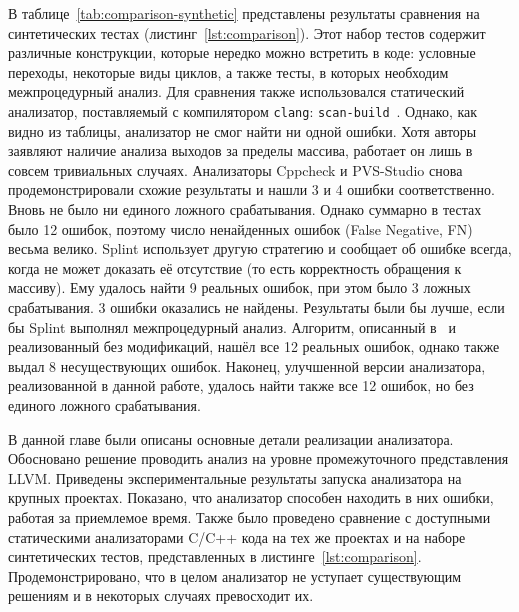 В таблице~\ref{tab:comparison-synthetic} представлены результаты
сравнения на синтетических тестах (листинг~\ref{lst:comparison}). Этот
набор тестов содержит различные конструкции, которые нередко можно
встретить в коде: условные переходы, некоторые виды циклов, а также
тесты, в которых необходим межпроцедурный анализ. Для сравнения также
использовался статический анализатор, поставляемый с компилятором
\texttt{clang}: \texttt{scan-build}~\cite{scan-build}. Однако, как
видно из таблицы, анализатор не смог найти ни одной ошибки. Хотя
авторы заявляют наличие анализа выходов за пределы массива, работает
он лишь в совсем тривиальных случаях. Анализаторы Cppcheck и
PVS-Studio снова продемонстрировали схожие результаты и нашли 3 и 4
ошибки соответственно. Вновь не было ни единого ложного
срабатывания. Однако суммарно в тестах было 12 ошибок, поэтому число
ненайденных ошибок (False Negative, FN) весьма велико. Splint
использует другую стратегию и сообщает об ошибке всегда, когда не
может доказать её отсутствие (то есть корректность обращения к
массиву). Ему удалось найти 9 реальных ошибок, при этом было 3 ложных
срабатывания. 3 ошибки оказались не найдены. Результаты были бы лучше,
если бы Splint выполнял межпроцедурный анализ. Алгоритм, описанный
в~\cite{li2010practical} и реализованный без модификаций, нашёл все 12
реальных ошибок, однако также выдал 8 несуществующих ошибок. Наконец,
улучшенной версии анализатора, реализованной в данной работе, удалось
найти также все 12 ошибок, но без единого ложного срабатывания.

\chapterconclusion

В данной главе были описаны основные детали реализации
анализатора. Обосновано решение проводить анализ на уровне
промежуточного представления LLVM.  Приведены экспериментальные
результаты запуска анализатора на крупных проектах. Показано, что
анализатор способен находить в них ошибки, работая за приемлемое
время. Также было проведено сравнение с доступными статическими
анализаторами C/C++ кода на тех же проектах и на наборе синтетических
тестов, представленных в
листинге~\ref{lst:comparison}. Продемонстрировано, что в целом
анализатор не уступает существующим решениям и в некоторых случаях
превосходит их.
